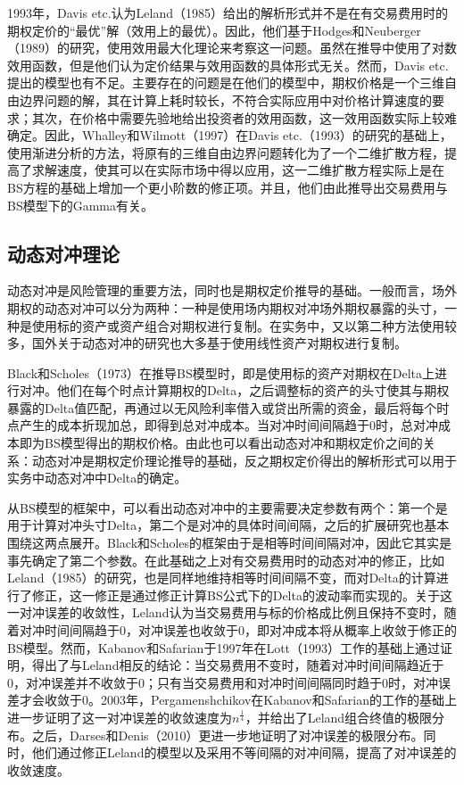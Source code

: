 1993年，Davis etc.认为Leland（1985）给出的解析形式并不是在有交易费用时的期权定价的“最优”解（效用上的最优）。因此，他们基于Hodges和Neuberger（1989）的研究，使用效用最大化理论来考察这一问题。虽然在推导中使用了对数效用函数，但是他们认为定价结果与效用函数的具体形式无关。然而，Davis etc.提出的模型也有不足。主要存在的问题是在他们的模型中，期权价格是一个三维自由边界问题的解，其在计算上耗时较长，不符合实际应用中对价格计算速度的要求；其次，在价格中需要先验地给出投资者的效用函数，这一效用函数实际上较难确定。因此，Whalley和Wilmott（1997）在Davis etc.（1993）的研究的基础上，使用渐进分析的方法，将原有的三维自由边界问题转化为了一个二维扩散方程，提高了求解速度，使其可以在实际市场中得以应用，这一二维扩散方程实际上是在BS方程的基础上增加一个更小阶数的修正项。并且，他们由此推导出交易费用与BS模型下的Gamma有关。

\subsection{动态对冲理论}

动态对冲是风险管理的重要方法，同时也是期权定价推导的基础。一般而言，场外期权的动态对冲可以分为两种：一种是使用场内期权对冲场外期权暴露的头寸，一种是使用标的资产或资产组合对期权进行复制。在实务中，又以第二种方法使用较多，国外关于动态对冲的研究也大多基于使用线性资产对期权进行复制。

Black和Scholes（1973）在推导BS模型时，即是使用标的资产对期权在Delta上进行对冲。他们在每个时点计算期权的Delta，之后调整标的资产的头寸使其与期权暴露的Delta值匹配，再通过以无风险利率借入或贷出所需的资金，最后将每个时点产生的成本折现加总，即得到总对冲成本。当对冲时间间隔趋于0时，总对冲成本即为BS模型得出的期权价格。由此也可以看出动态对冲和期权定价之间的关系：动态对冲是期权定价理论推导的基础，反之期权定价得出的解析形式可以用于实务中动态对冲中Delta的确定。

从BS模型的框架中，可以看出动态对冲中的主要需要决定参数有两个：第一个是用于计算对冲头寸Delta，第二个是对冲的具体时间间隔，之后的扩展研究也基本围绕这两点展开。Black和Scholes的框架由于是相等时间间隔对冲，因此它其实是事先确定了第二个参数。在此基础之上对有交易费用时的动态对冲的修正，比如Leland（1985）的研究，也是同样地维持相等时间间隔不变，而对Delta的计算进行了修正，这一修正是通过修正计算BS公式下的Delta的波动率而实现的。关于这一对冲误差的收敛性，Leland认为当交易费用与标的价格成比例且保持不变时，随着对冲时间间隔趋于0，对冲误差也收敛于0，即对冲成本将从概率上收敛于修正的BS模型。然而，Kabanov和Safarian于1997年在Lott（1993）工作的基础上通过证明，得出了与Leland相反的结论：当交易费用不变时，随着对冲时间间隔趋近于0，对冲误差并不收敛于0；只有当交易费用和对冲时间间隔同时趋于0时，对冲误差才会收敛于0。2003年，Pergamenshchikov在Kabanov和Safarian的工作的基础上进一步证明了这一对冲误差的收敛速度为$n^{\frac{1}{4}}$，并给出了Leland组合终值的极限分布。之后，Darses和Denis（2010）更进一步地证明了对冲误差的极限分布。同时，他们通过修正Leland的模型以及采用不等间隔的对冲间隔，提高了对冲误差的收敛速度。

